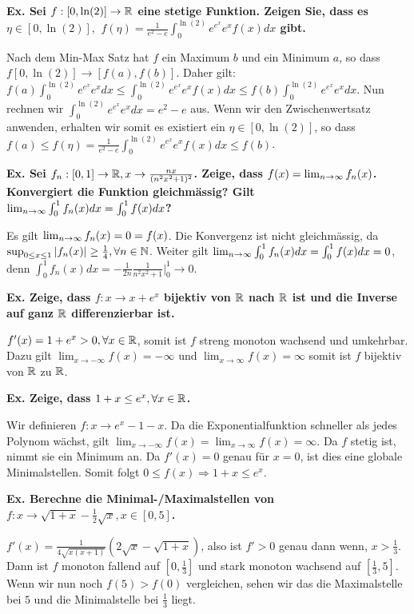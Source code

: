 \textbf{Ex. Sei $f : [0, \ln(2)] \to \mathbb{R}$ eine stetige Funktion. Zeigen Sie, dass es $\eta \in [0, \ln(2)],$ $f(\eta) = \frac{1}{e^2 - e}\int_0^{\ln(2)}e^{e^x}e^xf(x)dx$ gibt.}

Nach dem Min-Max Satz hat $f$ ein Maximum $b$ und ein Minimum $a$, so dass $f[0, \ln(2)] \to [f(a), f(b)]$. Daher gilt: $f(a) \int_0^{\ln(2)}e^{e^x}e^xdx \leq \int_0^{\ln(2)}e^{e^x}e^xf(x)dx \leq f(b)\int_0^{\ln(2)}e^{e^x}e^xdx$. Nun rechnen wir $\int_0^{\ln(2)}e^{e^x}e^xdx = e^2-e$ aus. Wenn wir den Zwischenwertsatz anwenden, erhalten wir somit es existiert ein $\eta \in [0, \ln(2)]$, so dass $f(a) \leq f(\eta) = \frac{1}{e^2 - e} \int_0^{\ln(2)}e^{e^x}e^xf(x)dx \leq f(b)$.
\medskip

\textbf{Ex. Sei $f_n : [0,1] \to \mathbb{R}, x \to \frac{nx}{(n^2x^2+1)^2}$. Zeige, dass $f(x) = \lim_{n \rightarrow \infty} f_n(x)$. Konvergiert die Funktion gleichmässig? Gilt $\lim_{n \rightarrow \infty} \int_0^1 f_n(x)dx = \int_0^1f(x)dx$?}

Es gilt $\lim_{n \rightarrow \infty} f_n(x) = 0 = f(x)$. Die Konvergenz ist nicht gleichmässig, da $\sup_{0 \leq x \leq 1}|f_n(x)| \geq \frac{1}{4}, \forall n \in \mathbb{N}$. Weiter gilt $\lim_{n \rightarrow \infty} \int_0^1f_n(x)dx = \int_0^1f(x)dx = 0$, denn $\int_0^1f_n(x)dx = -\frac{1}{2n} \frac{1}{n^2x^2 + 1}|_0^1 \to 0$.
\medskip


\textbf{Ex. Zeige, dass $f : x \to x + e^x$ bijektiv von $\mathbb{R}$ nach $\mathbb{R}$ ist und die Inverse auf ganz
$\mathbb{R}$ differenzierbar ist.}

$f'(x) = 1 + e^x > 0, \forall x \in \mathbb{R}$, somit ist $f$ streng monoton wachsend und umkehrbar. Dazu gilt
$\lim_{x \to - \infty}f(x) = - \infty$ und $\lim_{x \to \infty} f(x)= \infty$ somit ist $f$ bijektiv von 
$\mathbb{R}$ zu $\mathbb{R}$. \medskip

\textbf{Ex. Zeige, dass $1 + x \leq e^x, \forall x \in \mathbb{R}$.}

Wir definieren $f : x \to e^x - 1 - x$. Da die Exponentialfunktion schneller als jedes Polynom wächst,
gilt $\lim_{x \to - \infty} f(x) = \lim_{x \to \infty} f(x) = \infty$. Da $f$ stetig ist, nimmt sie
ein Minimum an. Da $f'(x) = 0$ genau für $x = 0$, ist dies eine globale Minimalstellen. Somit folgt 
$0 \leq f(x) \Rightarrow 1 + x \leq e^x$. \medskip

\textbf{Ex. Berechne die Minimal-/Maximalstellen von $f : x \to \sqrt{1 + x} - \frac{1}{2}\sqrt{x}, x \in [0,5]$.} 

$f'(x) = \frac{1}{4\sqrt{x(x+1)}}(2\sqrt{x}-\sqrt{1+x})$, also ist $f' > 0$ genau dann wenn, $x > \frac{1}{3}$.
Dann ist $f$ monoton fallend auf $[0,\frac{1}{3}]$ und stark monoton wachsend auf $[\frac{1}{3},5]$.
Wenn wir nun noch $f(5) > f(0)$ vergleichen, sehen wir das die Maximalstelle bei $5$ und die Minimalstelle 
bei $\frac{1}{3}$ liegt. \medskip

